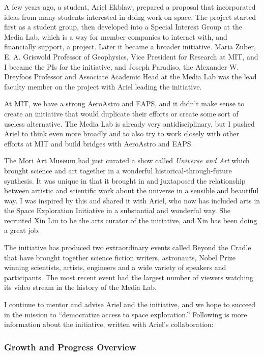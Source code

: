 A few years ago, a student, Ariel Ekblaw, prepared a proposal that incorporated ideas from many students interested in doing work on space. The project started first as a student group, then developed into a Special Interest Group at the Media Lab, which is a way for member companies to interact with, and financially support, a project. Later it became a broader initiative. Maria Zuber, E. A. Griswold Professor of Geophysics, Vice President for Research at MIT, and I became the \ac{PI}s for the initiative, and Joseph Paradiso, the Alexander W. Dreyfoos Professor and Associate Academic Head at the Media Lab was the lead faculty member on the project with Ariel leading the initiative.

At MIT, we have a strong \ac{AeroAstro} and \ac{EAPS}, and it didn't make sense to create an initiative that would duplicate their efforts or create some sort of useless alternative. The Media Lab is already very antidisciplinary, but I pushed Ariel to think even more broadly and to also try to work closely with other efforts at MIT and build bridges with \ac{AeroAstro} and \ac{EAPS}.

The Mori Art Museum had just curated a show called \textit{Universe and Art} which brought science and art together in a wonderful historical-through-future synthesis. It was  unique in that it brought in and juxtaposed the relationship between artistic and scientific work about the universe  in a sensible and beautiful way. I was inspired by this and shared it with Ariel, who now has included arts in the Space Exploration Initiative in a substantial and wonderful way. She recruited Xin Liu to be the arts curator of the initiative, and Xin has been doing a great job.

The initiative has produced two extraordinary events called Beyond the Cradle that have brought together science fiction writers, astronauts, Nobel Prize winning scientists, artists, engineers and a wide variety of speakers and participants. The most recent event had the largest number of viewers watching its video stream in the history of the Media Lab.

I continue to mentor and advise Ariel and the initiative, and we hope to succeed in the mission to ``democratize access to space exploration.'' Following is more information about the initiative, written with Ariel's collaboration:

\subsubsection{Growth and Progress Overview}

